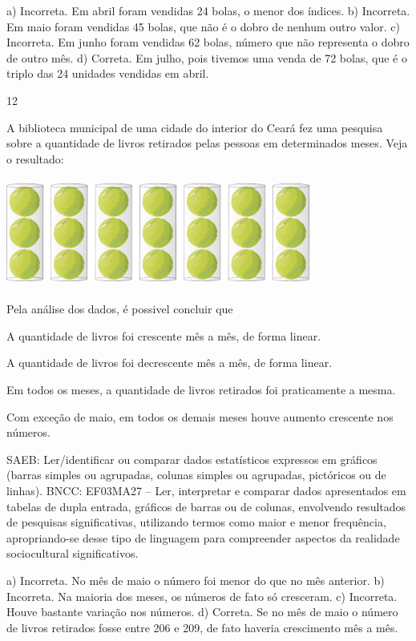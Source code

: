 {\begin{escolha}
{a) Incorreta. Em abril foram vendidas 24 bolas, o menor dos índices.
b) Incorreta. Em maio foram vendidas 45 bolas, que não é o dobro de nenhum outro valor.
c) Incorreta. Em junho foram vendidas 62 bolas, número que não representa o dobro de outro mês.
d) Correta. Em julho, pois tivemos uma venda de 72 bolas, que é o triplo das 24 unidades vendidas em abril.

\num{12}

A biblioteca municipal de uma cidade do interior do Ceará fez uma pesquisa sobre a quantidade de livros retirados pelas pessoas em determinados meses. Veja o resultado:


\includegraphics[width=3.93590in,height=1.40906in]{media/image121.png}

Pela análise dos dados, é possivel concluir que

\begin{escolha}
\item
  A quantidade de livros foi crescente mês a mês, de forma linear.
\item
  A quantidade de livros foi decrescente mês a mês, de forma linear.
\item
  Em todos os meses, a quantidade de livros retirados foi praticamente a mesma.
\item
  Com exceção de maio, em todos os demais meses houve aumento crescente nos números.
\end{escolha}

SAEB: Ler/identificar ou comparar dados estatísticos
expressos em gráficos (barras simples ou agrupadas, colunas simples ou
agrupadas, pictóricos ou de linhas).
BNCC: EF03MA27 -- Ler, interpretar e comparar dados apresentados em tabelas de dupla entrada,
gráficos de barras ou de colunas, envolvendo resultados de pesquisas significativas, utilizando
termos como maior e menor frequência, apropriando-se desse tipo de linguagem para compreender aspectos da realidade sociocultural significativos.

a) Incorreta. No mês de maio o número foi menor do que no mês anterior.
b) Incorreta. Na maioria dos meses, os números de fato só cresceram.
c) Incorreta. Houve bastante variação nos números.
d) Correta. Se no mês de maio o número de livros retirados fosse entre 206 e 209, de fato haveria crescimento mês a mês.

}
\end{escolha}}

